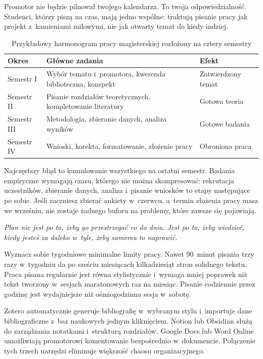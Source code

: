 \documentclass[11pt,a5paper,twoside,openany]{book}
\newcommand{\pullquote}[1]{%
  \par\vspace{12pt}\noindent
  \begin{tcolorbox}[blanker, breakable, left=2.2em, right=1em, top=2pt, bottom=2pt,
    borderline west={2.5pt}{0pt}{accent}]
    {\color{chaptercolor}\Large\itshape #1}
  \end{tcolorbox}\vspace{10pt}\par
}
\begin{document}
Promotor nie będzie pilnował twojego kalendarza. To twoja odpowiedzialność. Studenci, którzy piszą na czas, mają jedno wspólne: traktują pisanie pracy jak projekt z~kamieniami milowymi, nie jak otwarty temat do kiedy indziej.

\begin{table}[ht]
\centering
\caption{Przykładowy harmonogram pracy magisterskiej rozłożony na cztery semestry}
\begin{tabularx}{\textwidth}{lXl}
\toprule
\rowcolor{tableheadbg} \textcolor{tableheadfg}{\textbf{Okres}} & \textcolor{tableheadfg}{\textbf{Główne zadania}} & \textcolor{tableheadfg}{\textbf{Efekt}} \\
\midrule
Semestr I & Wybór tematu i~promotora, kwerenda biblioteczna, konspekt & Zatwierdzony temat \\
Semestr II & Pisanie rozdziałów teoretycznych, kompletowanie literatury & Gotowa teoria \\
Semestr III & Metodologia, zbieranie danych, analiza wyników & Gotowe badania \\
Semestr IV & Wnioski, korekta, formatowanie, złożenie pracy & Obroniona praca \\
\bottomrule
\end{tabularx}
\end{table}

Najczęstszy błąd to kumulowanie wszystkiego na ostatni semestr. Badania empiryczne wymagają czasu, którego nie można skompresować: rekrutacja uczestników, zbieranie danych, analiza i~pisanie wniosków to etapy następujące po sobie. Jeśli zaczniesz zbierać ankiety w~czerwcu, a~termin złożenia pracy masz we wrześniu, nie zostaje żadnego buforu na problemy, które zawsze się pojawiają.

\pullquote{Plan nie jest po to, żeby go przestrzegać co do dnia. Jest po to, żeby wiedzieć, kiedy jesteś za daleko w~tyle, żeby samemu to naprawić.}

Wyznacz sobie tygodniowe minimalne limity pracy. Nawet 90~minut pisania trzy razy w~tygodniu da po sześciu miesiącach kilkadziesiąt stron solidnego tekstu. Praca pisana regularnie jest równa stylistycznie i~wymaga mniej poprawek niż tekst tworzony w~sesjach maratonowych raz na miesiąc. Pisanie codziennie przez godzinę jest wydajniejsze niż ośmiogodzinna sesja w~sobotę.

\begin{tipbox}
Zotero automatycznie generuje bibliografię w~wybranym stylu i~importuje dane bibliograficzne z~baz naukowych jednym kliknięciem. Notion lub Obsidian służą do zarządzania notatkami i~strukturą rozdziałów. Google Docs lub Word Online umożliwiają promotorowi komentowanie bezpośrednio w~dokumencie. Połączenie tych trzech narzędzi eliminuje większość chaosu organizacyjnego.
\end{tipbox}
\end{document}
